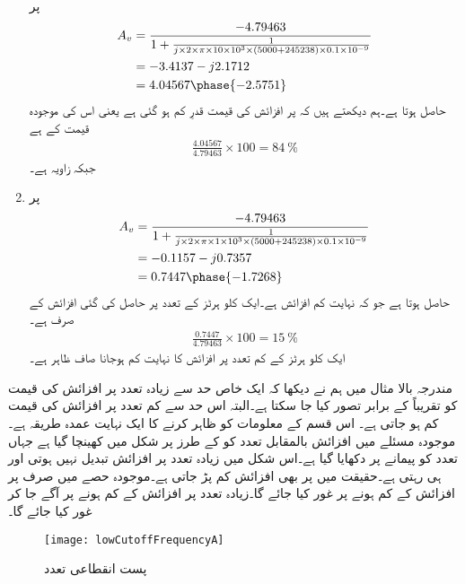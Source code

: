 \begin{enumerate}
 پر
\begin{align*}
A_v &=\frac{-4.79463}{1 + \frac{1}{j \times 2 \times \pi \times 10 \times 10^{3} \times  (5000+245238) \times 0.1 \times 10^{-9}}} \\
&=-3.4137-j 2.1712\\
&=4.04567 \phase {-2.5751}
\end{align*}
حاصل ہوتا ہے۔ہم دیکھتے ہیں کہ   پر افزائش کی قیمت قدرِ کم ہو گئی ہے یعنی اس کی موجودہ قیمت   کے   ہے 
\begin{align*}
\frac{4.04567}{4.79463} \times 100=\SI{84}{\percent}
\end{align*}
جبکہ زاویہ  ہے۔
%
\item
{}  پر
\begin{align*}
A_v &=\frac{-4.79463}{1 + \frac{1}{j \times 2 \times \pi \times 1 \times 10^{3} \times  (5000+245238) \times 0.1 \times 10^{-9}}} \\
&=-0.1157-j 0.7357\\
&=0.7447 \phase {-1.7268}
\end{align*}
حاصل ہوتا ہے جو کہ نہایت کم افزائش ہے۔ایک کلو ہرٹز کے تعدد پر حاصل کی گئی افزائش  کے صرف   ہے۔
\begin{align*}
\frac{0.7447}{4.79463} \times 100=\SI{15}{\percent}
\end{align*}
ایک کلو ہرٹز کے کم تعدد پر افزائش کا نہایت کم ہوجانا صاف ظاہر ہے۔
\end{enumerate}
مندرجہ بالا مثال میں ہم نے دیکھا کہ ایک خاص حد سے زیادہ تعدد پر افزائش کی قیمت کو تقریباً  کے برابر تصور کیا جا سکتا ہے۔البتہ اس حد سے کم تعدد پر افزائش کی قیمت کم ہو جاتی ہے۔ اس قسم کے معلومات کو ظاہر کرنے کا ایک نہایت عمدہ طریقہ ہے۔موجودہ مسئلے میں افزائش بالمقابل تعدد کو  کے طرز پر شکل  میں کھینچا گیا ہے جہاں تعدد کو   پیمانے پر دکھایا گیا ہے۔اس شکل میں زیادہ تعدد پر افزائش تبدیل نہیں ہوتی اور   ہی رہتی ہے۔حقیقت میں  پر بھی افزائش کم پڑ جاتی ہے۔موجودہ حصے میں صرف  پر افزائش کے کم ہونے پر غور کیا جائے گا۔زیادہ تعدد پر افزائش کے کم ہونے پر آگے جا کر غور کیا جائے گا۔
\begin{figure}
\centering
\texttt{[image: lowCutoffFrequencyA]}
\caption{ پست انقطاعی تعدد}
\label{شکل_پست_انقطاعی_تعدد_الف}
\end{figure}
